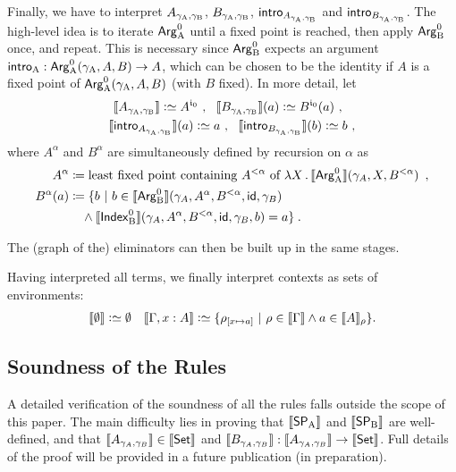 \documentclass{article}
\begin{document}
Finally, we have to interpret $A_{\gamma_{\mathrm{A}}, \gamma_{\mathrm{B}}}$, $B_{\gamma_{\mathrm{A}}, \gamma_{\mathrm{B}}}$,
$\mathsf{intro}_{A_{\gamma_{\mathrm{A}}, \gamma_{\mathrm{B}}}}$ and $\mathsf{intro}_{B_{\gamma_{\mathrm{A}}, \gamma_{\mathrm{B}}}}$.  The high-level
idea is to iterate $\mathsf{Arg}^{0}_{\mathrm{A}}$ until a fixed point is reached, then apply
$\mathsf{Arg}^{0}_{\mathrm{B}}$ once, and repeat. This is necessary since $\mathsf{Arg}^{0}_{\mathrm{B}}$ expects an
argument $\mathsf{intro}_{\mathrm{A}} : \mathsf{Arg}^{0}_{\mathrm{A}}(\gamma_{\mathrm{A}}, A, B) \to A$, which can be chosen
to be the identity if $A$ is a fixed point of $\mathsf{Arg}^{0}_{\mathrm{A}}(\gamma_{\mathrm{A}}, A, B)$
(with $B$ fixed). In more detail, let
\begin{gather*}
\sem{A_{\gammaAB}} \colonsimeq A^{\cardz} \enspace\! , \quad\!\!
\sem{B_{\gammaAB}}(a) \colonsimeq B^{\cardz}(a)\enspace\! , \quad\!\! \\
\sem{\intro{A_{\gammaAB}}}(a) \colonsimeq a \enspace\! ,\quad\!\!
\sem{\intro{B_{\gammaAB}}}(b) \colonsimeq b \enspace\! ,
\end{gather*}  \noindent 
where $A^{\alpha}$ and $B^{\alpha}$ are
simultaneously defined by recursion on $\alpha$ as
\begin{align*}
  A^{\alpha} & \coloneqq  \text{least fixed point containing $A^{< \alpha}$ of }
       \lambda X\,.\, \llbracket \mathsf{Arg}^{0}_{\mathrm{A}} \rrbracket(\gamma_A, X, B^{< \alpha}) \enspace ,\\
  B^{\alpha}(a) & \coloneqq \{b\ |\ b \in \llbracket \mathsf{Arg}^{0}_{\mathrm{B}} \rrbracket(\gamma_A, A^{\alpha},
  B^{< \alpha}, \mathsf{id}, \gamma_B) \\
  & \quad \land \llbracket \mathsf{Index}^{0}_{\mathrm{B}} \rrbracket(\gamma_A,
  A^{\alpha}, B^{< \alpha}, \mathsf{id}, \gamma_B, b) = a \}\enspace \hspace{-2.47968pt} .
\end{align*}

The (graph of the) eliminators can then be built up in the same
stages.

Having interpreted all terms, we finally interpret contexts as sets of environments:
\begin{align*}
  \llbracket \emptyset \rrbracket \mathrel{\mathop:}\simeq \emptyset && \llbracket \Gamma, x : A \rrbracket \mathrel{\mathop:}\simeq \{
  \rho_{[x \mapsto a]} \ |\ \rho \in \llbracket \Gamma \rrbracket \land a \in \llbracket A \rrbracket_\rho\}.
\end{align*}

\subsection{Soundness of the Rules}

A detailed verification of the soundness of all the rules falls
outside the scope of this paper. The main difficulty lies in proving
that $\llbracket \mathsf{SP}_{\mathrm{A}} \rrbracket$ and $\llbracket \mathsf{SP}_{\mathrm{B}} \rrbracket$ are well-defined, and that
$\llbracket A_{\gamma_A, \gamma_B} \rrbracket \in \llbracket \mathsf{Set} \rrbracket$ and $\llbracket B_{\gamma_A,
    \gamma_B} \rrbracket : \llbracket A_{\gamma_A, \gamma_B} \rrbracket \to \llbracket \mathsf{Set} \rrbracket$. Full
details of the proof will be provided in a future publication (in
preparation).
\end{document}

